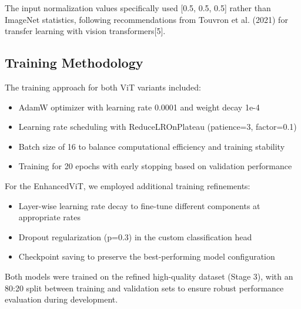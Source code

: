 The input normalization values specifically used [0.5, 0.5, 0.5] rather than ImageNet statistics, following recommendations from Touvron et al. (2021) for transfer learning with vision transformers[5].

\subsection{Training Methodology}

The training approach for both ViT variants included:

\begin{itemize}
    \item AdamW optimizer with learning rate 0.0001 and weight decay 1e-4
    \item Learning rate scheduling with ReduceLROnPlateau (patience=3, factor=0.1)
    \item Batch size of 16 to balance computational efficiency and training stability
    \item Training for 20 epochs with early stopping based on validation performance
\end{itemize}

For the EnhancedViT, we employed additional training refinements:

\begin{itemize}
    \item Layer-wise learning rate decay to fine-tune different components at appropriate rates
    \item Dropout regularization (p=0.3) in the custom classification head
    \item Checkpoint saving to preserve the best-performing model configuration
\end{itemize}

Both models were trained on the refined high-quality dataset (Stage 3), with an 80:20 split between training and validation sets to ensure robust performance evaluation during development.


